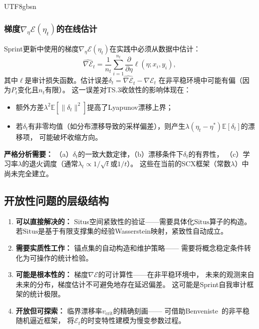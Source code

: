 \documentclass[12pt,a4paper]{article}
\newcommand{\E}{\mathbb{E}}
\newcommand{\Situs}{\mathrm{Situs}}
\begin{document}
\begin{CJK}{UTF8}{gbsn}
\subsubsection{梯度$\nabla_\eta\mathcal{E}(\eta_t)$的在线估计}
Sprint更新中使用的梯度$\nabla_\eta\mathcal{E}(\eta_t)$在实践中必须从数据中估计：
\[
\widehat{\nabla\mathcal{E}}_t = \frac{1}{n_t}\sum_{i=1}^{n_t}
\frac{\partial}{\partial\eta}\ell(\eta; x_i, y_i),
\]
其中$\ell$是审计损失函数。估计误差$\delta_t = \widehat{\nabla\mathcal{E}}_t - \nabla\mathcal{E}_t$
在非平稳环境中可能有偏（因为$P_t$变化且$n_t$有限）。
这一误差对TS.3收敛性的影响体现在：
\begin{itemize}
\item 额外方差$\lambda^2\E[\|\delta_t\|^2]$提高了Lyapunov漂移上界；
\item 若$\delta_t$有非零均值（如分布漂移导致的采样偏差），则产生$\lambda(\eta_t-\eta^*)\E[\delta_t]$的漂移项，
  可能破坏收缩方向。
\end{itemize}
\textbf{严格分析需要：} （a）$\delta_t$的一致大数定律，（b）漂移条件下$\delta_t$的有界性，
（c）学习率$\lambda$的退火调度（通常$\lambda_t \propto 1/\sqrt{t}$或$1/t$）。
这些在当前的SCX框架（常数$\lambda$）中尚未完全建立。

\subsection{开放性问题的层级结构}

\begin{enumerate}
\item \textbf{可以直接解决的：} Situs空间紧致性的验证——需要具体化$\Situs$算子的构造。
  若$\Situs$是基于有限支撑集的经验Wasserstein映射，紧致性自动成立。
\item \textbf{需要实质性工作：} 锚点集的自动构造和维护策略——
  需要将概念稳定条件转化为可操作的统计检验。
\item \textbf{可能是根本性的：} 梯度$\nabla\mathcal{E}$的可计算性——在非平稳环境中，
  未来的观测来自未来的分布，梯度估计不可避免地存在延迟偏差。
  这可能是Sprint自我审计框架的统计极限。
\item \textbf{开放但可探索：} 临界漂移率$v_{\text{crit}}$的精确刻画——
  可借助Benveniste~\citep{benveniste1990adaptive}的非平稳随机逼近框架，
  将$\mathcal{E}_t$的时变特性建模为慢变参数过程。
\end{enumerate}

\end{CJK}

\end{document}
